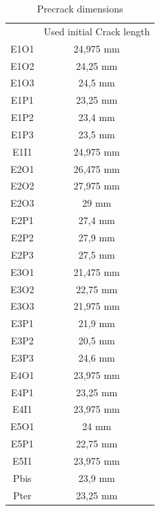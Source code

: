 \begin{table}[h]
	\centering
	\begin{tabular}{c c }
		\multicolumn{1}{l}{} & \multicolumn{1}{l}{Used initial Crack length} \\
		\multicolumn{1}{c}{\cellcolor[HTML]{F8CBAD}E1O1} & 24,975   mm \\
		\multicolumn{1}{c}{\cellcolor[HTML]{F8CBAD}E1O2} & 24,25 mm \\
		\multicolumn{1}{c}{\cellcolor[HTML]{F8CBAD}E1O3} & 24,5 mm \\
		\multicolumn{1}{c}{\cellcolor[HTML]{C65911}E1P1} & 23,25 mm \\ 
		\cellcolor[HTML]{C65911}E1P2 & 23,4 mm \\ 
		\cellcolor[HTML]{C65911}E1P3 & 23,5 mm \\ 
		\multicolumn{1}{c}{\cellcolor[HTML]{BF8F00}E1I1} & 24,975 mm \\ 
		\multicolumn{1}{c}{\cellcolor[HTML]{F8CBAD}E2O1} & 26,475 mm \\ 
		\multicolumn{1}{c}{\cellcolor[HTML]{F8CBAD}E2O2} & 27,975 mm \\ 
		\multicolumn{1}{c}{\cellcolor[HTML]{F8CBAD}E2O3} & 29 mm \\ 
		\multicolumn{1}{c}{\cellcolor[HTML]{C65911}E2P1} & 27,4 mm \\ 
		\multicolumn{1}{c}{\cellcolor[HTML]{C65911}E2P2} & 27,9 mm \\ 
		\multicolumn{1}{c}{\cellcolor[HTML]{C65911}E2P3} & 27,5 mm \\ 
		\multicolumn{1}{c}{\cellcolor[HTML]{F8CBAD}E3O1} & 21,475 mm \\ 
		\multicolumn{1}{c}{\cellcolor[HTML]{F8CBAD}E3O2} & 22,75 mm \\ 
		\multicolumn{1}{c}{\cellcolor[HTML]{F8CBAD}E3O3} & 21,975 mm \\ 
		\multicolumn{1}{c}{\cellcolor[HTML]{C65911}E3P1} & 21,9 mm \\
		\multicolumn{1}{c}{\cellcolor[HTML]{C65911}E3P2} & 20,5 mm \\ 
		\multicolumn{1}{c}{\cellcolor[HTML]{C65911}E3P3} & 24,6 mm \\ 
		\multicolumn{1}{c}{\cellcolor[HTML]{F8CBAD}E4O1} & 23,975 mm \\ 
		\multicolumn{1}{c}{\cellcolor[HTML]{C65911}E4P1} & 23,25 mm \\ 
		\multicolumn{1}{c}{\cellcolor[HTML]{BF8F00}E4I1} & 23,975 mm \\ 
		\multicolumn{1}{c}{\cellcolor[HTML]{F8CBAD}E5O1} & 24 mm \\ 
		\multicolumn{1}{c}{\cellcolor[HTML]{C65911}E5P1} & 22,75 mm \\ 
		\multicolumn{1}{c}{\cellcolor[HTML]{BF8F00}E5I1} & 23,975 mm \\ 
		\multicolumn{1}{c}{\cellcolor[HTML]{C65911}Pbis} & 23,9 mm \\ 
		\multicolumn{1}{c}{\cellcolor[HTML]{C65911}Pter} & 23,25 mm \\ 
\end{tabular}
\caption{Precrack dimensions}
\label{tab:Tab11}
\end{table}
